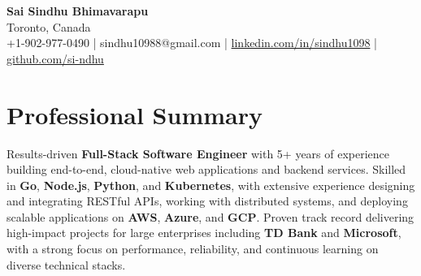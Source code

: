 \documentclass[letterpaper,11pt]{article}
\begin{document}
\begin{center}
  {\Large \textbf{Sai Sindhu Bhimavarapu}} \\
  Toronto, Canada \\
  +1-902-977-0490 \enspace | \enspace sindhu10988@gmail.com \enspace | \enspace \href{https://www.linkedin.com/in/sindhu1098/}{linkedin.com/in/sindhu1098} \enspace | \enspace \href{https://github.com/si-ndhu}{github.com/si-ndhu}
\end{center}

\section{Professional Summary}
  \begin{itemize}[leftmargin=0.15in, label={}]
    \small{\item{
     Results-driven \textbf{Full-Stack Software Engineer} with 5+ years of experience building end-to-end, cloud-native web applications and backend services. Skilled in \textbf{Go}, \textbf{Node.js}, \textbf{Python}, and \textbf{Kubernetes}, with extensive experience designing and integrating RESTful APIs, working with distributed systems, and deploying scalable applications on \textbf{AWS}, \textbf{Azure}, and \textbf{GCP}. Proven track record delivering high-impact projects for large enterprises including \textbf{TD Bank} and \textbf{Microsoft}, with a strong focus on performance, reliability, and continuous learning on diverse technical stacks.
    }}
  \end{itemize}
\vspace{-16pt}

\end{document}
